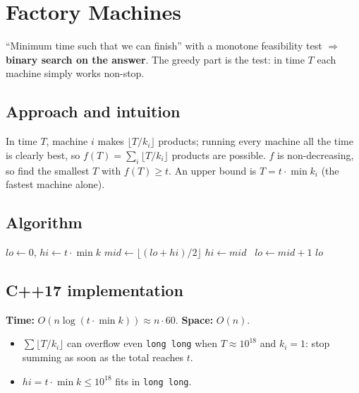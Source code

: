 \section{Factory Machines}
\label{sec:g-factory}


\begin{patternbox}
``Minimum time such that we can finish'' with a monotone feasibility test
$\Rightarrow$ \textbf{binary search on the answer}. The greedy part is the
test: in time $T$ each machine simply works non-stop.
\end{patternbox}

\subsection*{Approach and intuition}

In time $T$, machine $i$ makes $\lfloor T/k_i\rfloor$ products; running every
machine all the time is clearly best, so $f(T)=\sum_i\lfloor T/k_i\rfloor$
products are possible. $f$ is non-decreasing, so find the smallest $T$ with
$f(T)\ge t$. An upper bound is $T=t\cdot\min k_i$ (the fastest machine alone).

\subsection*{Algorithm}
\begin{algorithmic}[1]
\State $lo\gets0$, $hi\gets t\cdot\min k$
  \State $mid\gets\lfloor(lo+hi)/2\rfloor$
   $hi\gets mid$ \Else\ $lo\gets mid+1$ \EndIf
\EndWhile
\State \Return $lo$
\end{algorithmic}


\subsection*{C++17 implementation}

\begin{complexitybox}
\textbf{Time:} $O(n\log(t\cdot\min k))\approx n\cdot 60$. \textbf{Space:} $O(n)$.
\end{complexitybox}

\begin{pitfallbox}
\begin{itemize}
  \item $\sum\lfloor T/k_i\rfloor$ can overflow even \texttt{long long}
        when $T\approx10^{18}$ and $k_i=1$: stop summing as soon as the
        total reaches $t$.
  \item $hi=t\cdot\min k\le10^{18}$ fits in \texttt{long long}.
\end{itemize}
\end{pitfallbox}
